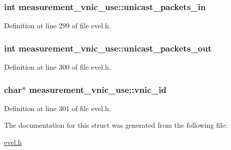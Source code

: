 \subsubsection[{unicast\+\_\+packets\+\_\+in}]{\setlength{\rightskip}{0pt plus 5cm}int measurement\+\_\+vnic\+\_\+use\+::unicast\+\_\+packets\+\_\+in}\label{structmeasurement__vnic__use_a674d1200ae67a951e79887bda5f4d48e}


Definition at line 299 of file evel.\+h.

\hypertarget{structmeasurement__vnic__use_a2d57335948323764d13a286b46b6b53d}{}
\subsubsection[{unicast\+\_\+packets\+\_\+out}]{\setlength{\rightskip}{0pt plus 5cm}int measurement\+\_\+vnic\+\_\+use\+::unicast\+\_\+packets\+\_\+out}\label{structmeasurement__vnic__use_a2d57335948323764d13a286b46b6b53d}


Definition at line 300 of file evel.\+h.

\hypertarget{structmeasurement__vnic__use_a2fd8f65f55f741c4c032ba2e6bda2da9}{}
\subsubsection[{vnic\+\_\+id}]{\setlength{\rightskip}{0pt plus 5cm}char$\ast$ measurement\+\_\+vnic\+\_\+use\+::vnic\+\_\+id}\label{structmeasurement__vnic__use_a2fd8f65f55f741c4c032ba2e6bda2da9}


Definition at line 301 of file evel.\+h.



The documentation for this struct was generated from the following file\+:\begin{DoxyCompactItemize}
\item 
\hyperlink{evel_8h}{evel.\+h}\end{DoxyCompactItemize}
